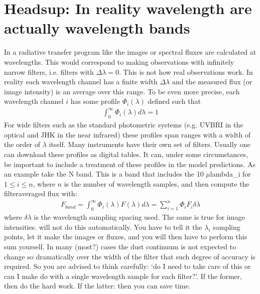 \documentclass[letterpaper,10pt,english]{sphinxmanual}
\begin{document}
\section{Heads\sphinxhyphen{}up: In reality wavelength are actually wavelength bands}
\label{\detokenize{imagesspectra:heads-up-in-reality-wavelength-are-actually-wavelength-bands}}\label{\detokenize{imagesspectra:sec-wavelength-bands}}
In a radiative transfer program like  the images or
spectral fluxes are calculated at  wavelengths. This would
correspond to making observations with infinitely narrow filters, i.e.
filters with \(\Delta\lambda=0\). This is not how real observations work.
In reality each wavelength channel has a finite width \(\Delta\lambda\) and
the measured flux (or image intensity) is an average over this range. To
be even more precise, each wavelength channel \(i\) has some profile
\(\Phi_i(\lambda)\) defined such that
\begin{equation*}
\begin{split}\int_0^{\infty}\Phi_i(\lambda)d\lambda=1\end{split}
\end{equation*}
For wide filters such as the standard photometric systems (e.g. UVBRI in
the optical and JHK in the near infrared) these profiles span ranges with a
width of the order of \(\lambda\) itself. Many instruments have their own
set of filters. Usually one can download these profiles as digital tables.
It can, under some circumstances, be important to include a treatment of
these profiles in the model predictions. As an example take the N band. This
is a band that includes the 10 \(\mu\)lambda\_i\textasciigrave{} for \(1\le i\le n\), where \(n\) is the number of
wavelength samples, and then compute the filter\sphinxhyphen{}averaged flux with:
\begin{equation*}
\begin{split}F_{band} = \int_0^{\infty}\Phi_i(\lambda)F(\lambda)d\lambda
= \sum_{i=1}^{n} \Phi_i F_i \delta\lambda\end{split}
\end{equation*}
where \(\delta\lambda\) is the wavelength sampling spacing used. The same is
true for image intensities.  will not do this
automatically. You have to tell it the \(\lambda_i\) sampling points, let it
make the images or fluxes, and you will then have to perform this sum
yourself.  In many (most?)
cases the dust continuum is not expected to change so dramatically over the
width of the filter that such degree of accuracy is required. So you are
advised to think carefully: ‘do I need to take care of this or can I make
do with a single wavelength sample for each filter?’. If the former, then
do the hard work. If the latter: then you can save time.
\end{document}
